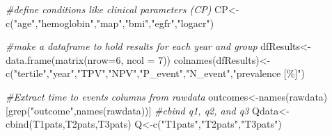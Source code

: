 \documentclass[
]{article}
\newenvironment{Shaded}{\begin{snugshade}}{\end{snugshade}}
\newcommand{\AttributeTok}[1]{\textcolor[rgb]{0.77,0.63,0.00}{#1}}
\newcommand{\CommentTok}[1]{\textcolor[rgb]{0.56,0.35,0.01}{\textit{#1}}}
\newcommand{\DecValTok}[1]{\textcolor[rgb]{0.00,0.00,0.81}{#1}}
\newcommand{\FunctionTok}[1]{\textcolor[rgb]{0.00,0.00,0.00}{#1}}
\newcommand{\NormalTok}[1]{#1}
\newcommand{\OtherTok}[1]{\textcolor[rgb]{0.56,0.35,0.01}{#1}}
\newcommand{\StringTok}[1]{\textcolor[rgb]{0.31,0.60,0.02}{#1}}
\begin{document}
\begin{Shaded}
\begin{Highlighting}[]
\CommentTok{\#define conditions like clinical parameters (CP) }
\NormalTok{CP}\OtherTok{\textless{}{-}}\FunctionTok{c}\NormalTok{(}\StringTok{"age"}\NormalTok{,}\StringTok{"hemoglobin"}\NormalTok{,}\StringTok{"map"}\NormalTok{,}\StringTok{"bmi"}\NormalTok{,}\StringTok{"egfr"}\NormalTok{,}\StringTok{"logacr"}\NormalTok{)}

\CommentTok{\#make a dataframe to hold results for each year and group}
\NormalTok{dfResults}\OtherTok{\textless{}{-}}\FunctionTok{data.frame}\NormalTok{(}\FunctionTok{matrix}\NormalTok{(}\AttributeTok{nrow=}\DecValTok{6}\NormalTok{, }\AttributeTok{ncol =} \DecValTok{7}\NormalTok{))}
\FunctionTok{colnames}\NormalTok{(dfResults)}\OtherTok{\textless{}{-}}\FunctionTok{c}\NormalTok{(}\StringTok{"tertile"}\NormalTok{,}\StringTok{"year"}\NormalTok{,}\StringTok{"TPV"}\NormalTok{,}\StringTok{"NPV"}\NormalTok{,}\StringTok{"P\_event"}\NormalTok{,}\StringTok{"N\_event"}\NormalTok{,}\StringTok{"prevalence [\%]"}\NormalTok{)}


\CommentTok{\#Extract time to events columns from rawdata}
\NormalTok{outcomes}\OtherTok{\textless{}{-}}\FunctionTok{names}\NormalTok{(rawdata)[}\FunctionTok{grep}\NormalTok{(}\StringTok{"outcome"}\NormalTok{,}\FunctionTok{names}\NormalTok{(rawdata))]}
\CommentTok{\#cbind q1, q2, and q3}
\NormalTok{Qdata}\OtherTok{\textless{}{-}}\FunctionTok{cbind}\NormalTok{(T1pats,T2pats,T3pats)}
\NormalTok{Q}\OtherTok{\textless{}{-}}\FunctionTok{c}\NormalTok{(}\StringTok{"T1pats"}\NormalTok{,}\StringTok{"T2pats"}\NormalTok{,}\StringTok{"T3pats"}\NormalTok{)}


\end{Highlighting}
\end{Shaded}
\end{document}
